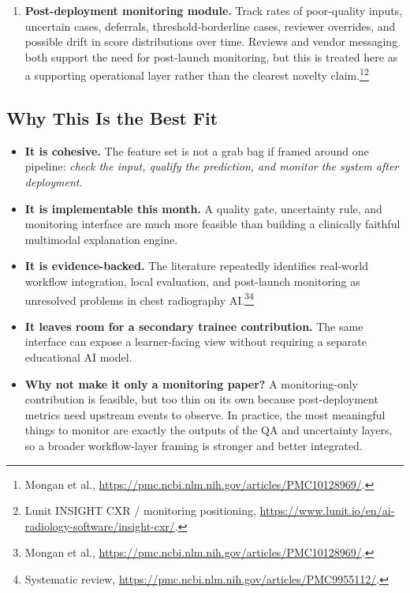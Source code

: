\documentclass[11pt]{article}
\begin{document}
\begin{enumerate}[leftmargin=1.8em]
    \item \textbf{Post-deployment monitoring module.} Track rates of poor-quality inputs, uncertain cases, deferrals, threshold-borderline cases, reviewer overrides, and possible drift in score distributions over time. Reviews and vendor messaging both support the need for post-launch monitoring, but this is treated here as a supporting operational layer rather than the clearest novelty claim.\footnote{Mongan et al., \url{https://pmc.ncbi.nlm.nih.gov/articles/PMC10128969/}.}\footnote{Lunit INSIGHT CXR / monitoring positioning, \url{https://www.lunit.io/en/ai-radiology-software/insight-cxr/}.}
\end{enumerate}

\subsection{Why This Is the Best Fit}

\begin{itemize}[leftmargin=1.5em]
    \item \textbf{It is cohesive.} The feature set is not a grab bag if framed around one pipeline: \emph{check the input, qualify the prediction, and monitor the system after deployment.}
    \item \textbf{It is implementable this month.} A quality gate, uncertainty rule, and monitoring interface are much more feasible than building a clinically faithful multimodal explanation engine.
    \item \textbf{It is evidence-backed.} The literature repeatedly identifies real-world workflow integration, local evaluation, and post-launch monitoring as unresolved problems in chest radiography AI.\footnote{Mongan et al., \url{https://pmc.ncbi.nlm.nih.gov/articles/PMC10128969/}.}\footnote{Systematic review, \url{https://pmc.ncbi.nlm.nih.gov/articles/PMC9955112/}.}
    \item \textbf{It leaves room for a secondary trainee contribution.} The same interface can expose a learner-facing view without requiring a separate educational AI model.
    \item \textbf{Why not make it only a monitoring paper?} A monitoring-only contribution is feasible, but too thin on its own because post-deployment metrics need upstream events to observe. In practice, the most meaningful things to monitor are exactly the outputs of the QA and uncertainty layers, so a broader workflow-layer framing is stronger and better integrated.
\end{itemize}
\end{document}
